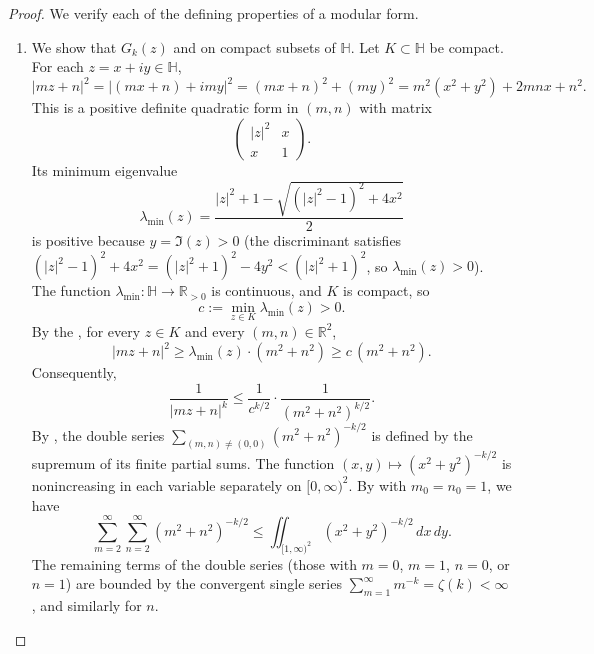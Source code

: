 \begin{proof}
We verify each of the defining properties of a modular form.

\begin{enumerate}
  \item We show that $G_k(z)$  and  on compact subsets of $\mathbb{H}$. Let $K \subset \mathbb{H}$ be compact. For each $z = x + iy \in \mathbb{H}$,
  $$|mz + n|^2 = |(mx+n) + imy|^2 = (mx + n)^2 + (my)^2 = m^2(x^2 + y^2) + 2mnx + n^2.$$
  This is a positive definite quadratic form in $(m,n)$ with matrix
  $$\begin{pmatrix} |z|^2 & x \\ x & 1 \end{pmatrix}.$$
  Its minimum eigenvalue
  $$\lambda_{\min}(z) = \frac{|z|^2 + 1 - \sqrt{(|z|^2 - 1)^2 + 4x^2}}{2}$$
  is positive because $y = \Im(z) > 0$ (the discriminant satisfies $(|z|^2-1)^2 + 4x^2 = (|z|^2+1)^2 - 4y^2 < (|z|^2+1)^2$, so $\lambda_{\min}(z) > 0$). The function $\lambda_{\min} : \mathbb{H} \to \mathbb{R}_{>0}$ is continuous, and $K$ is compact, so
  $$c := \min_{z \in K} \lambda_{\min}(z) > 0.$$
  By the , for every $z \in K$ and every $(m,n) \in \mathbb{R}^2$,
  $$|mz + n|^2 \geq \lambda_{\min}(z) \cdot (m^2 + n^2) \geq c\,(m^2 + n^2).$$
  Consequently,
  $$\frac{1}{|mz + n|^k} \leq \frac{1}{c^{k/2}} \cdot \frac{1}{(m^2 + n^2)^{k/2}}.$$
  By , the double series $\sum_{(m,n) \neq (0,0)} (m^2 + n^2)^{-k/2}$ is defined by the supremum of its finite partial sums. The function $(x,y) \mapsto (x^2+y^2)^{-k/2}$ is nonincreasing in each variable separately on $[0,\infty)^2$. By  with $m_0 = n_0 = 1$, we have
	  $$\sum_{m=2}^{\infty} \sum_{n=2}^{\infty} (m^2 + n^2)^{-k/2} \leq \iint_{[1,\infty)^2} (x^2 + y^2)^{-k/2}\,dx\,dy.$$
	  The remaining terms of the double series (those with $m=0$, $m=1$, $n=0$, or $n=1$) are bounded by the convergent single series $\sum_{m=1}^\infty m^{-k} = \zeta(k) < \infty$, and similarly for $n$.


\end{enumerate}
\end{proof}
